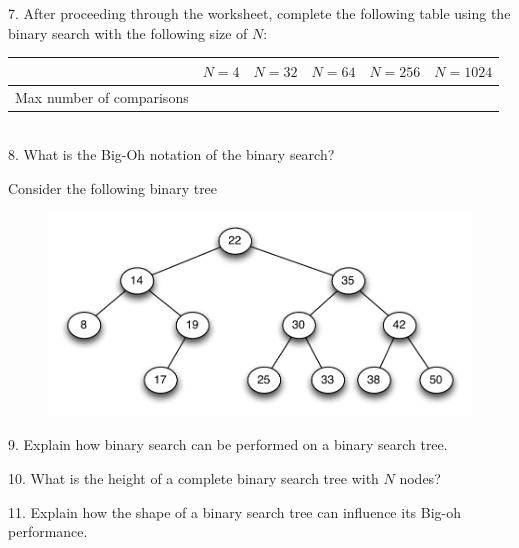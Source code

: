 \documentclass[11pt]{article}
\begin{document}
 7. After proceeding through the worksheet, complete the following table using the binary search with the following size of $N$: 

\begin{tabular}{|c|c|c|c|c|c|} \hline
&   $N = 4$ & $N = 32$ & $N = 64$ & $N = 256$ & $N = 1024$   \\ \hline 
Max number of comparisons & & & & &   \\ \hline
\end{tabular} \\

8. What is the Big-Oh notation of the binary search?

Consider the following binary tree
\begin{figure}[h]
\centerline {
\includegraphics[width=5in]{TreeExerciseGraph.pdf}
}
\end{figure}

9. Explain how  binary search can be performed on a binary search tree. 

 10. What is the height of a complete binary search tree with $N$ nodes?

 11. Explain how the shape of a binary search tree can influence its Big-oh performance.


 
\end{document}
